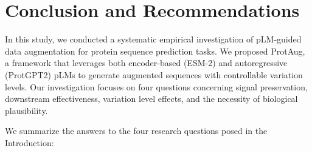 \documentclass{article}
\begin{document}
\section{Conclusion and Recommendations}

In this study, we conducted a systematic empirical investigation of pLM-guided data augmentation for protein sequence prediction tasks. We proposed ProtAug, a framework that leverages both encoder-based (ESM-2) and autoregressive (ProtGPT2) pLMs to generate augmented sequences with controllable variation levels. Our investigation focuses on four questions concerning signal preservation, downstream effectiveness, variation level effects, and the necessity of biological plausibility.

We summarize the answers to the four research questions posed in the Introduction:
\end{document}
